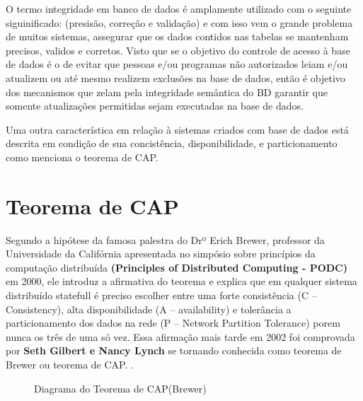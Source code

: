 O termo integridade em banco de dados é amplamente utilizado com o seguinte siguinificado: (presisão, correção e validação) e com isso vem o grande problema de muitos sistemas, 
assegurar que os dados contidos nas tabelas se mantenham precisos, validos e corretos. Visto que se o objetivo do controle de acesso à base de dados é o de evitar que pessoas e/ou programas 
não autorizados leiam e/ou atualizem ou até mesmo realizem exclusões na base de dados, então é objetivo dos mecanismos que zelam pela integridade semântica do BD garantir que somente 
atualizações permitidas sejam executadas na base de dados.

Uma outra característica em relação à sistemas criados com base de dados está descrita em condição de sua concistência, disponibilidade, e particionamento como menciona o teorema de CAP.

\section{Teorema de CAP}
Segundo a hipótese da famosa palestra do Drº Erich Brewer, professor da Universidade da Califórnia apresentada no simpósio sobre princípios da computação distribuída \textbf{ (Principles of Distributed Computing - PODC) } 
em 2000, ele introduz a afirmativa do teorema e explica que em qualquer sistema distribuído statefull é preciso escolher entre uma forte consistência (C – Consistency), alta disponibilidade (A – availability) e tolerância a particionamento dos dados na rede (P – Network Partition Tolerance)
porem nunca os três de uma só vez. Essa afirmação mais tarde em 2002 foi comprovada por \textbf{ Seth Gilbert e Nancy Lynch } se tornando conhecida como teorema de Brewer ou teorema de CAP. \cite{BREWER}.

\begin{figure}[ht]
    \centering
    \caption{Diagrama do Teorema de CAP(Brewer)}
    \label{submeter}
\end{figure}


